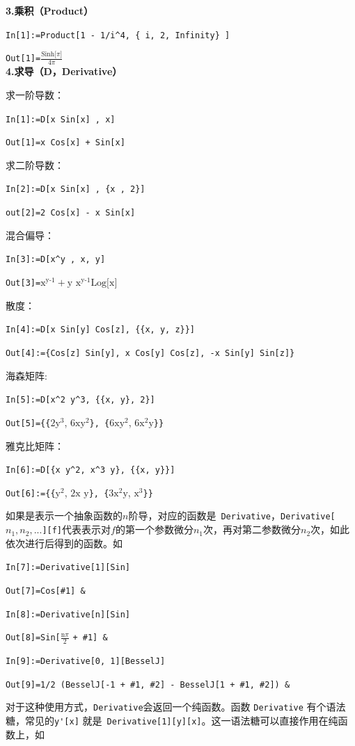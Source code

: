 \documentclass[UTF8,a4paper,10pt]{ctexart}
\begin{document}
\textbf{3.乘积（Product）}

\verb|In[1]:=Product[1 - 1/i^4, { i, 2, Infinity} ]|

\verb|Out[1]=|$\frac{\text{Sinh[}\pi \text{]}}{4 \pi }$
\\


\textbf{4.求导（D，Derivative）}

求一阶导数：

\verb|In[1]:=D[x Sin[x] , x]|

\verb|Out[1]=x Cos[x] + Sin[x]|

求二阶导数：

\verb|In[2]:=D[x Sin[x] , {x , 2}]|

\verb|out[2]=2 Cos[x] - x Sin[x]|

混合偏导：

\verb|In[3]:=D[x^y , x, y]|

\verb|Out[3]=|$\text{x}^\text{y-1}+\text{y } \text{x}^\text{y-1} \text{Log[x]}$

散度：

\verb|In[4]:=D[x Sin[y] Cos[z], {{x, y, z}}]|

\verb|Out[4]:={Cos[z] Sin[y], x Cos[y] Cos[z], -x Sin[y] Sin[z]}|

海森矩阵:

\verb|In[5]:=D[x^2 y^3, {{x, y}, 2}]|

\verb|Out[5]={{|$2 \text{y}^3$, $6 \text{x}  \text{y}^2$\verb|}, {|$6 \text{x} \text{y}^ 2$, $6 \text{x}^2 \text{y}$\verb|}}|

雅克比矩阵：

\verb|In[6]:=D[{x y^2, x^3 y}, {{x, y}}]|

\verb|Out[6]:={{|$\text{y}^2$, $2 \text{x y}$\verb|}, {|$3 \text{x}^2 \text{y}$, $\text{x}^3$\verb|}}|

如果是表示一个抽象函数的$n$阶导，对应的函数是~\verb|Derivative|，\verb|Derivative[|$n_1, n_2,...$\verb|][f]|代表表示对$f$的第一个参数微分$n_1$次，再对第二参数微分$n_2$次，如此依次进行后得到的函数。如

\verb|In[7]:=Derivative[1][Sin]|   

\verb|Out[7]=Cos[#1] &|

\verb|In[8]:=Derivative[n][Sin]|   

\verb|Out[8]=Sin[|$\frac{\text{n} \pi}{2}$ \verb|+ #1] & |

\verb|In[9]:=Derivative[0, 1][BesselJ]|   

\verb|Out[9]=1/2 (BesselJ[-1 + #1, #2] - BesselJ[1 + #1, #2]) &|

对于这种使用方式，\verb|Derivative|会返回一个纯函数。函数 \verb|Derivative| 有个语法糖，常见的\verb|y'[x]| 就是~\verb|Derivative[1][y][x]|。这一语法糖可以直接作用在纯函数上，如
\end{document}
